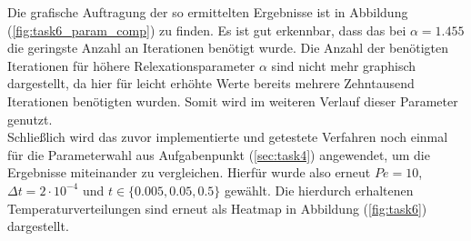 \documentclass[12pt,a4paper,titlepage,headinclude,bibtotoc]{scrartcl}
\begin{document}
\noindent\begin{minipage}[t]{0.45\textwidth}%
\vspace{1cm}
Die grafische Auftragung der so ermittelten Ergebnisse ist in Abbildung (\ref{fig:task6_param_comp}) zu finden. Es ist gut erkennbar, dass das bei $\alpha=1.455$ die geringste Anzahl an Iterationen benötigt wurde. Die Anzahl der benötigten Iterationen für höhere Relexationsparameter $\alpha$ sind nicht mehr graphisch dargestellt, da hier für leicht erhöhte Werte bereits mehrere Zehntausend Iterationen benötigten wurden. Somit wird im weiteren Verlauf dieser Parameter genutzt.\\
Schließlich wird das zuvor implementierte und getestete Verfahren noch einmal für die Parameterwahl aus Aufgabenpunkt (\ref{sec:task4}) angewendet, um die Ergebnisse miteinander zu vergleichen. Hierfür wurde also erneut $Pe = 10$, $\Delta t = 2 \cdot 10^{-4}$ und $t \in \{0.005, 0.05, 0.5\}$ gewählt. Die hierdurch erhaltenen Temperaturverteilungen sind erneut als Heatmap in Abbildung (\ref{fig:task6}) dargestellt.
\end{minipage}%
\hfill%
\end{document}
